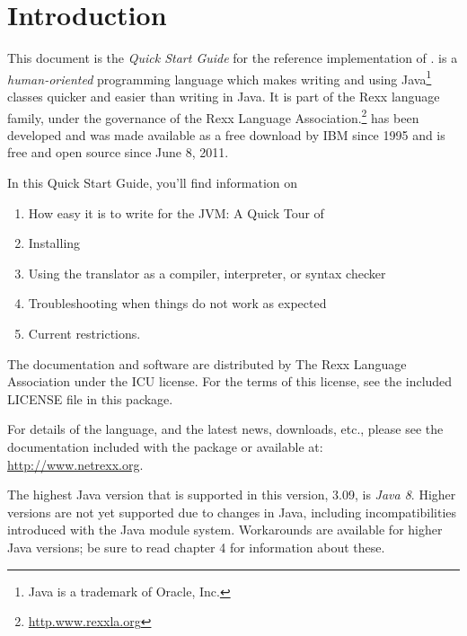 \chapter{Introduction}
This document is the \emph{Quick Start Guide} for the reference implementation of
\nr{}. \nr{} is a \emph{human-oriented} programming language which makes
writing and using Java\footnote{Java is a trademark of Oracle, Inc.}
classes quicker and easier than writing in Java. It is part of the Rexx
language family, under the governance of the Rexx Language
Association.\footnote{\url{http.www.rexxla.org}} \nr{} has been
developed and was made available as a free download by IBM since 1995
and is free and open source since June 8, 2011.

In this Quick Start Guide, you’ll find information on
\begin{enumerate} 
\item How easy it is to write for the JVM: A Quick Tour of \nr{}
\item Installing \nr{} 
\item Using the \nr{} translator as a compiler, interpreter, or
  syntax checker 
\item Troubleshooting when things do not work as expected
\item Current restrictions.
\end{enumerate} 
The \nr{} documentation and software are distributed
by The Rexx Language Association under the \textsc{ICU} license. For
the terms of this license, see the included \textsc{LICENSE} file in
this package.

For details of the \nr{} language, and the latest news, downloads,
etc., please see the \nr{} documentation included with the package
or available at: \url{http://www.netrexx.org}.

\begin{shaded}\noindent
The highest Java version that is supported in this version, 3.09, is
\emph{Java 8}. Higher versions are not yet supported due to changes in
Java, including incompatibilities introduced with the Java module
system. Workarounds are available for higher Java versions; be sure to
read chapter 4 for information about these.
\end{shaded}\indent
